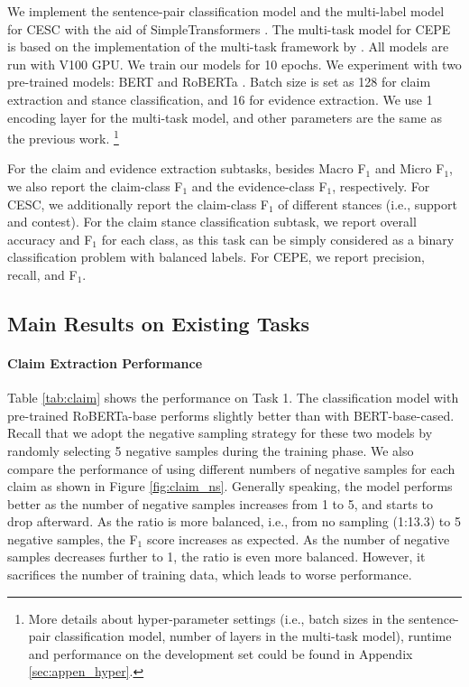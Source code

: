 \documentclass[11pt]{article}
\begin{document}
We implement the sentence-pair classification model and the multi-label model for CESC with the aid of SimpleTransformers \cite{rajapakse2019simpletransformers}.
The multi-task model for CEPE is based on the implementation of the multi-task framework by \citet{cheng2021argument}.
All models are run with V100 GPU.
We train our models for 10 epochs.
We experiment with two pre-trained models: BERT \cite{devlin2019bert} and RoBERTa \cite{liu2019roberta}.
Batch size is set as 128 for claim extraction and stance classification, and 16 for evidence extraction.
We use 1 encoding layer for the multi-task model, and other parameters are the same as the previous work.
\footnote{More details about hyper-parameter settings (i.e., batch sizes in the sentence-pair classification model, number of layers in the multi-task model), runtime and performance on the development set could be found in Appendix \ref{sec:appen_hyper}.}

For the claim and evidence extraction subtasks, besides Macro F$_1$ and Micro F$_1$, we also report the claim-class F$_1$ and the evidence-class F$_1$, respectively.
For CESC, we additionally report the claim-class F$_1$ of different stances (i.e., support and contest).
For the claim stance classification subtask, we report overall accuracy and F$_1$ for each class, as this task can be simply considered as a binary classification problem with balanced labels.
For CEPE, we report precision, recall, and F$_1$.

\subsection{Main Results on Existing Tasks}






\paragraph{Claim Extraction Performance}
Table \ref{tab:claim} shows the performance on Task 1.
The classification model with pre-trained RoBERTa-base performs slightly better than with BERT-base-cased.
Recall that we adopt the negative sampling strategy for these two models by randomly selecting 5 negative samples during the training phase.
We also compare the performance of using different numbers of negative samples for each claim as shown in Figure \ref{fig:claim_ns}.
Generally speaking, the model performs better as the number of negative samples increases from 1 to 5, and starts to drop afterward.
As the ratio is more balanced, i.e., from no sampling (1:13.3) to 5 negative samples, the F$_1$ score increases as expected.
As the number of negative samples decreases further to 1, the ratio is even more balanced.
However, it sacrifices the number of training data, which leads to worse performance.
\end{document}
